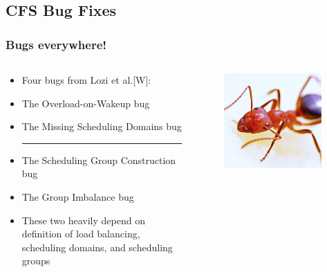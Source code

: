 \documentclass{beamer}
\newcommand{\linespace}{\vskip 0.25cm}
\begin{document}
\subsection{CFS Bug Fixes}
\begin{frame}
\frametitle{Bugs everywhere!}

\begin{columns}
\begin{column}{0.72\textwidth}
\begin{itemize}
	\item[] Four bugs from Lozi et al.[W]:
	\item The Overload-on-Wakeup bug
	\item The Missing Scheduling Domains bug
	
	\linespace	
	\noindent\rule{4cm}{0.4pt}
	\linespace	
	
	\item The Scheduling Group Construction bug
	\item The Group Imbalance bug

	\linespace
	
\item[] These two heavily depend on definition of load balancing, scheduling domains, and scheduling groups
	
\end{itemize}
\end{column}
\begin{column}[b]{0.28\textwidth} %
\begin{figure}
\centering
\includegraphics[width=0.95\textwidth]{Illustrations/ant_from_pexels.png}
\end{figure}
\end{column}
\end{columns}

\end{frame}
\end{document}
